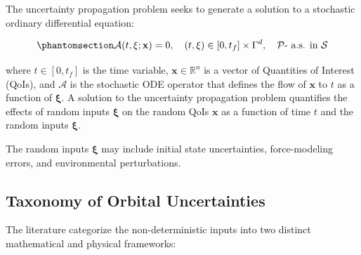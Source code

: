 \documentclass[
  letterpaper,
  DIV=11,
  numbers=noendperiod,
  oneside]{scrartcl}
\begin{document}
The uncertainty propagation problem seeks to generate a solution to a
stochastic ordinary differential equation:

\begin{equation}\protect\phantomsection\label{eq-stochastic-ode}{
\mathcal{A}(t, \mathbf{\xi}; \mathbf{x}) = 0, 
\quad (t, \mathbf{\xi}) \in [0, t_f] \times \Gamma^d, 
\quad \mathcal{P}\text{- a.s. in } \mathcal{S}
}\end{equation}

where \(t \in [0, t_f]\) is the time variable,
\(\mathbf{x} \in \mathbb{R}^n\) is a vector of Quantities of Interest
(QoIs), and \(\mathcal{A}\) is the stochastic ODE operator that defines
the flow of \(\mathbf{x}\) to \(t\) as a function of \(\mathbf{\xi}\). A
solution to the uncertainty propagation problem quantifies the effects
of random inputs \(\mathbf{\xi}\) on the random QoIs \(\mathbf{x}\) as a
function of time \(t\) and the random inputs \(\boldsymbol{\xi}\).

The random inputs \(\boldsymbol{\xi}\) may include initial state
uncertainties, force-modeling errors, and environmental perturbations.

\subsection{Taxonomy of Orbital
Uncertainties}\label{taxonomy-of-orbital-uncertainties}

The literature categorize the non-deterministic inputs into two distinct
mathematical and physical frameworks:
\end{document}
